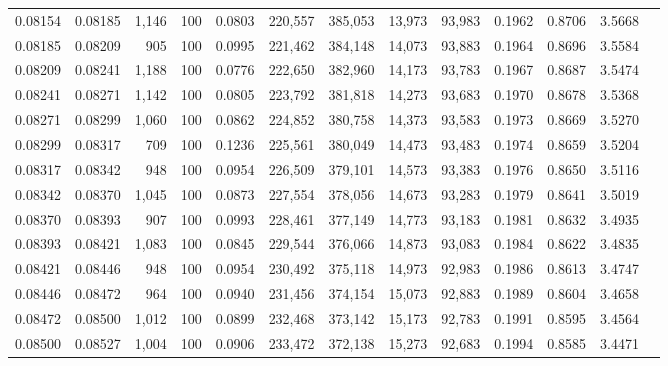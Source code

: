 \begin{tabular}{rrrrrrrrrrrrr}
0.08154 & 0.08185 & 1,146 & 100 &                                     0.0803 & 220,557 & 385,053 &  13,973 &  93,983 & 0.1962 & 0.8706 & 3.5668 \\
0.08185 & 0.08209 &   905 & 100 &                                     0.0995 & 221,462 & 384,148 &  14,073 &  93,883 & 0.1964 & 0.8696 & 3.5584 \\
0.08209 & 0.08241 & 1,188 & 100 &                                     0.0776 & 222,650 & 382,960 &  14,173 &  93,783 & 0.1967 & 0.8687 & 3.5474 \\
0.08241 & 0.08271 & 1,142 & 100 &                                     0.0805 & 223,792 & 381,818 &  14,273 &  93,683 & 0.1970 & 0.8678 & 3.5368 \\
0.08271 & 0.08299 & 1,060 & 100 &                                     0.0862 & 224,852 & 380,758 &  14,373 &  93,583 & 0.1973 & 0.8669 & 3.5270 \\
0.08299 & 0.08317 &   709 & 100 &                                     0.1236 & 225,561 & 380,049 &  14,473 &  93,483 & 0.1974 & 0.8659 & 3.5204 \\
0.08317 & 0.08342 &   948 & 100 &                                     0.0954 & 226,509 & 379,101 &  14,573 &  93,383 & 0.1976 & 0.8650 & 3.5116 \\
0.08342 & 0.08370 & 1,045 & 100 &                                     0.0873 & 227,554 & 378,056 &  14,673 &  93,283 & 0.1979 & 0.8641 & 3.5019 \\
0.08370 & 0.08393 &   907 & 100 &                                     0.0993 & 228,461 & 377,149 &  14,773 &  93,183 & 0.1981 & 0.8632 & 3.4935 \\
0.08393 & 0.08421 & 1,083 & 100 &                                     0.0845 & 229,544 & 376,066 &  14,873 &  93,083 & 0.1984 & 0.8622 & 3.4835 \\
0.08421 & 0.08446 &   948 & 100 &                                     0.0954 & 230,492 & 375,118 &  14,973 &  92,983 & 0.1986 & 0.8613 & 3.4747 \\
0.08446 & 0.08472 &   964 & 100 &                                     0.0940 & 231,456 & 374,154 &  15,073 &  92,883 & 0.1989 & 0.8604 & 3.4658 \\
0.08472 & 0.08500 & 1,012 & 100 &                                     0.0899 & 232,468 & 373,142 &  15,173 &  92,783 & 0.1991 & 0.8595 & 3.4564 \\
0.08500 & 0.08527 & 1,004 & 100 &                                     0.0906 & 233,472 & 372,138 &  15,273 &  92,683 & 0.1994 & 0.8585 & 3.4471 \\

\end{tabular}
